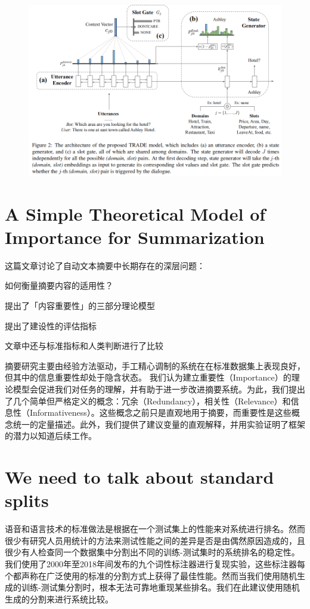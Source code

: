 \documentclass[a4paper,UTF8]{article}
\numberwithin{equation}{section}
\begin{document}
\begin{figure}[H]
	\centering
	\includegraphics[width=\textwidth]{5-2.png}
\end{figure}


\newpage
\section{A Simple Theoretical Model of Importance for Summarization}

这篇文章讨论了自动文本摘要中长期存在的深层问题：

如何衡量摘要内容的适用性？

提出了「内容重要性」的三部分理论模型

提出了建设性的评估指标

文章中还与标准指标和人类判断进行了比较

摘要研究主要由经验方法驱动，手工精心调制的系统在在标准数据集上表现良好，但其中的信息重要性却处于隐含状态。 我们认为建立重要性（Importance）的理论模型会促进我们对任务的理解，并有助于进一步改进摘要系统。为此，我们提出了几个简单但严格定义的概念：冗余（Redundancy），相关性（Relevance）和信息性（Informativeness）。这些概念之前只是直观地用于摘要，而重要性是这些概念统一的定量描述。此外，我们提供了建议变量的直观解释，并用实验证明了框架的潜力以知道后续工作。

\newpage
\section{We need to talk about standard splits}
语音和语言技术的标准做法是根据在一个测试集上的性能来对系统进行排名。然而很少有研究人员用统计的方法来测试性能之间的差异是否是由偶然原因造成的，且很少有人检查同一个数据集中分割出不同的训练-测试集时的系统排名的稳定性。我们使用了2000年至2018年间发布的九个词性标注器进行复现实验，这些标注器每个都声称在广泛使用的标准的分割方式上获得了最佳性能。然而当我们使用随机生成的训练-测试集分割时，根本无法可靠地重现某些排名。我们在此建议使用随机生成的分割来进行系统比较。
\end{document}
